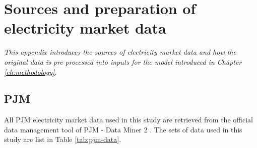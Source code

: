 
\chapter{Sources and preparation of electricity market data}
\label{sec:accounting-data-prepare}
\textit{This appendix introduces the sources of electricity market data and how the original data is pre-processed into inputs for the model introduced in Chapter \ref{ch:methodology}.}

\section{PJM}
All PJM electricity market data used in this study are retrieved from the official data management tool of PJM - Data Miner 2 \cite{Data_miner_2}. The sets of data used in this study are list in Table \ref{tab:pjm-data}.

